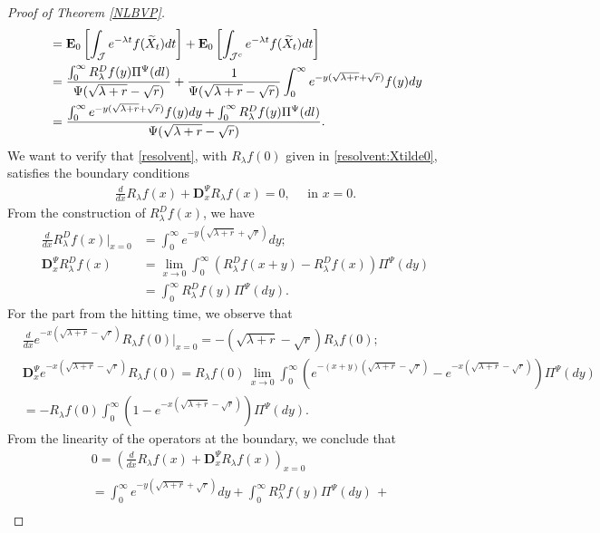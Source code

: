 \documentclass[11pt,a4paper]{article}
\theoremstyle{definition}
\theoremstyle{remark}
\begin{document}
\begin{proof}[Proof of Theorem \ref{NLBVP}]
\begin{align}
		&=\mathbf{E}_{0}  \left[\int_{\mathcal{J}} e^{-\lambda t} f(\widetilde{X}_t) dt\right] + \mathbf{E}_{0}  \left[\int_{\mathcal{J}^c} e^{-\lambda t} f(\widetilde{X}_t) dt\right] \notag \\
		&=\frac{\int_0^\infty {R}_\lambda^D f(y) \Pi^\Psi(dl)}{\Psi(\sqrt{\lambda+r}-\sqrt{r})} + \frac{1}{\Psi(\sqrt{\lambda + r} - \sqrt{r})} \int_0^\infty e^{-y(\sqrt{\lambda + r} + \sqrt{r})} f(y) dy \notag\\
		&= \frac{\int_0^\infty e^{-y(\sqrt{\lambda + r} + \sqrt{r})} f(y) dy + \int_0^\infty {R}_\lambda^D f(y) \Pi^\Psi(dl)}{\Psi(\sqrt{\lambda + r} - \sqrt{r})}.
	\end{align}
	We want to verify that \eqref{resolvent}, with $R_\lambda f(0)$ given in \eqref{resolvent:Xtilde0}, satisfies the boundary conditions
	\begin{align}
		\label{bc:resolvent}
		\frac{d}{dx} R_\lambda f(x) + \mathbf{D}_x^\Psi R_\lambda f(x)=0, \quad \text{ in } x=0.
	\end{align}
	From the construction of $R_\lambda^D f(x)$, we have
	\begin{align*}
		\frac{d}{dx} R_\lambda^D f(x) \big\vert_{x=0} &= \int_0^\infty e^{-y(\sqrt{\lambda + r} + \sqrt{r})} dy;\\
		\mathbf{D}_x^\Psi R_\lambda^D f(x)&= \lim_{x \to 0}\int_{0}^\infty (R^D_\lambda f(x+y) - R^D_\lambda f(x)) \Pi^\Psi(dy)\\
		&= \int_0^\infty R_\lambda^D f(y) \Pi^\Psi(dy).
	\end{align*}
	For the part from the hitting time, we observe that
	\begin{align*}
		&\frac{d}{dx} e^{-x(\sqrt{\lambda+ r} - \sqrt{r})} R_\lambda f(0) \big\vert_{x=0}= -(\sqrt{\lambda+ r} - \sqrt{r}) R_\lambda f(0);\\
		&\mathbf{D}_x^\Psi e^{-x(\sqrt{\lambda+ r} - \sqrt{r})} R_\lambda f(0) = R_\lambda f(0) \, \lim_{x \to 0} \int_0^\infty(e^{-(x+y)(\sqrt{\lambda+ r} - \sqrt{r})} - e^{-x(\sqrt{\lambda+ r} - \sqrt{r})} ) \Pi^\Psi(dy)\\
		&=- R_\lambda f(0) \int_{0}^\infty (1- e^{-x(\sqrt{\lambda+ r} - \sqrt{r})}) \Pi^\Psi(dy).
	\end{align*}
	From the linearity of the  operators at the boundary, we conclude that
	\begin{align*}
		&0=\left(\frac{d}{dx} R_\lambda f(x) + \mathbf{D}_x^\Psi R_\lambda f(x)\right)_{x=0}
		\\&=\int_0^\infty e^{-y(\sqrt{\lambda + r} + \sqrt{r})} dy + \int_0^\infty R_\lambda^D f(y) \Pi^\Psi(dy) \,+\\

\end{align*}
\end{proof}
\end{document}
